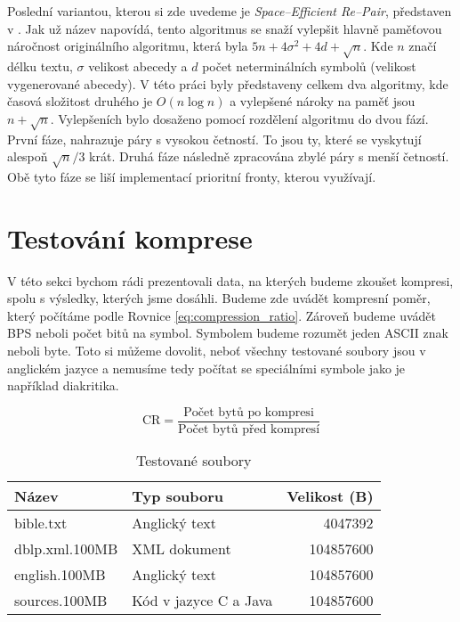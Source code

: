 \documentclass[a4paper,12pt]{article}
\begin{document}
Poslední variantou, kterou si zde uvedeme je \emph{Space--Efficient Re--Pair}, představen \linebreak v \cite{bille2017space}. Jak už název napovídá, tento algoritmus se snaží vylepšit hlavně paměťovou náročnost originálního algoritmu, která byla $5n + 4\sigma^2 + 4d + \sqrt{n}$. Kde $n$ značí délku textu, $\sigma$ velikost abecedy a $d$ počet neterminálních symbolů (velikost vygenerované abecedy). V této práci byly představeny celkem dva algoritmy, kde časová složitost druhého je $O(n \log n)$ a vylepšené nároky na paměť jsou $n + \sqrt{n}$.
Vylepšeních bylo dosaženo pomocí rozdělení algoritmu do dvou fází. První fáze, nahrazuje páry s vysokou četností. To jsou ty, které se vyskytují alespoň $\sqrt{n}/3$ krát. Druhá fáze následně zpracována zbylé páry s menší četností. Obě tyto fáze se liší implementací prioritní fronty, kterou využívají.


\newpage
\section{Testování komprese}
V této sekci bychom rádi prezentovali data, na kterých budeme zkoušet kompresi, spolu s výsledky, kterých jsme dosáhli. Budeme zde uvádět kompresní poměr, který počítáme podle Rovnice \ref{eq:compression_ratio}. Zároveň budeme uvádět BPS neboli počet bitů na symbol. Symbolem budeme rozumět jeden ASCII znak neboli byte. Toto si můžeme dovolit, neboť všechny testované soubory jsou v anglickém jazyce a nemusíme tedy počítat se speciálními symbole jako je například diakritika.

\begin{equation}
    \text{CR} = \frac{\text{Počet bytů po kompresi}}{\text{Počet bytů před kompresí}}
    \label{eq:compression_ratio}
\end{equation}

\begin{table}[h!]
    \centering
    \begin{tabular}{l | l | r}
    \toprule
    Název           & Typ souboru           & Velikost (B)  \\ \midrule
    bible.txt       & Anglický text         & 4047392       \\
    dblp.xml.100MB  & XML dokument          & 104857600     \\
    english.100MB   & Anglický text         & 104857600     \\
    sources.100MB   & Kód v jazyce C a Java & 104857600     \\
    \bottomrule
    \end{tabular}
    \caption{Testované soubory}
    \label{tab:cfg}
\end{table}
\end{document}
